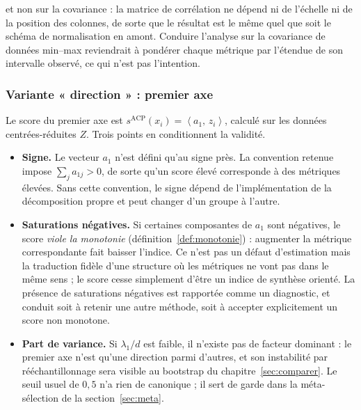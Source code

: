 \documentclass[11pt,a4paper]{article}
\theoremstyle{definition}
\theoremstyle{remark}
\newcommand{\scal}[2]{\left\langle #1 ,\, #2 \right\rangle}
\begin{document}
\bigskip

et non sur la covariance : la matrice de corrélation ne dépend ni de l'échelle ni de la
position des colonnes, de sorte que le résultat est le même quel que soit le schéma de
normalisation en amont. Conduire l'analyse sur la covariance de données min--max
reviendrait à pondérer chaque métrique par l'étendue de son intervalle observé, ce qui
n'est pas l'intention.

\bigskip

\subsubsection{Variante « direction » : premier axe}
\label{sec:acp-axe1}

\medskip

Le score du premier axe est $s^{\mathrm{ACP}}(x_i) = \scal{a_1}{z_i}$, calculé sur les
données centrées-réduites $Z$. Trois points en conditionnent la validité.

\medskip

\begin{itemize}[nosep,leftmargin=1.6em]
  \item \textbf{Signe.} Le vecteur $a_1$ n'est défini qu'au signe près. La convention
  retenue impose $\sum_j a_{1j} > 0$, de sorte qu'un score élevé corresponde à des
  métriques élevées. Sans cette convention, le signe dépend de l'implémentation de la
  décomposition propre et peut changer d'un groupe à l'autre.
  \item \textbf{Saturations négatives.} Si certaines composantes de $a_1$ sont négatives,
  le score \emph{viole la monotonie} (définition~\ref{def:monotonie}) : augmenter la
  métrique correspondante fait baisser l'indice. Ce n'est pas un défaut d'estimation mais
  la traduction fidèle d'une structure où les métriques ne vont pas dans le même sens ; le
  score cesse simplement d'être un indice de synthèse orienté. La présence de saturations
  négatives est rapportée comme un diagnostic, et conduit soit à retenir une autre
  méthode, soit à accepter explicitement un score non monotone.
  \item \textbf{Part de variance.} Si $\lambda_1/d$ est faible, il n'existe pas de facteur
  dominant : le premier axe n'est qu'une direction parmi d'autres, et son instabilité par
  rééchantillonnage sera visible au bootstrap du chapitre~\ref{sec:comparer}. Le seuil
  usuel de $0{,}5$ n'a rien de canonique ; il sert de garde dans la méta-sélection de la
  section~\ref{sec:meta}.
\end{itemize}
\end{document}
